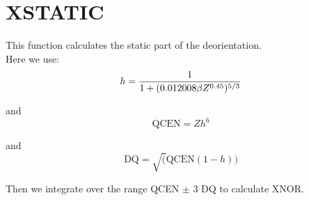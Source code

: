 \section{XSTATIC}
\label{sect:xstatic}

\noindent This function calculates the static part of the
deorientation.\\

\noindent Here we use:\\

\begin{equation}
h = {1 \over {1 + (0.012008 \beta Z^{0.45})^{5/3}}}
\end{equation}

\noindent and\\

\begin{equation}
\mathrm{QCEN} = Z h^6
\end{equation}

\noindent and\\

\begin{equation}
\mathrm{DQ} = \sqrt(\mathrm{QCEN} (1 - h))
\end{equation}

\noindent Then we integrate over the range QCEN $\pm$ 3 DQ to
calculate XNOR.\\
